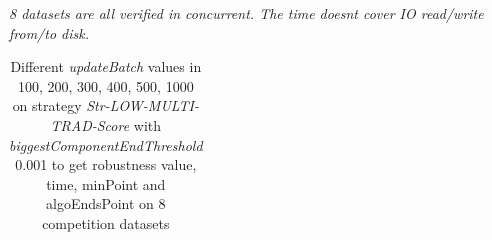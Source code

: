 \documentclass{article}
\begin{document}
\begin{table}[!htbp]
\begin{adjustwidth}{-3cm}{}
\begin{threeparttable}
\begin{tabular}{|c|c|c|c|c|c|c|c|c|c|}
				
				
			\end{tabular}
			\begin{tablenotes}
				\small
				\item\textit{ 8 datasets are all verified in concurrent. The time doesn\textquotesingle t cover IO read/write from/to disk.}
			\end{tablenotes}			
		\end{threeparttable}
	\end{adjustwidth}	
	\end{table}		

	\begin{table}[!htbp]
	\begin{adjustwidth}{-3cm}{}		
		\begin{threeparttable}		
			\centering
			\caption{Different \textit{updateBatch} values in 100, 200, 300, 400, 500, 1000 on strategy \textit{Str-LOW-MULTI-TRAD-Score} with \textit{biggestComponentEndThreshold} 0.001 to get robustness value, time, minPoint and algoEndsPoint on 8 competition datasets }
			\label{tab:table16}
			\begin{tabular}{|c|c|c|c|c|c|c|c|c|c|}
				\hline		
				

\end{tabular}
\end{threeparttable}
\end{adjustwidth}
\end{table}
\end{document}
